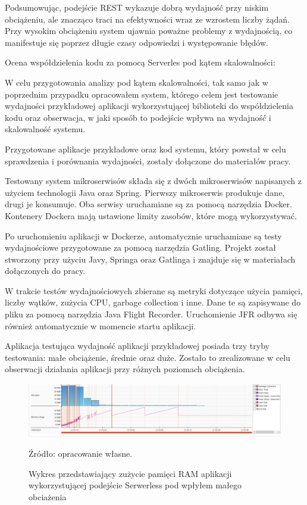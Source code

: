 \documentclass[runningheads,12pt]{llncs}
\begin{document}
Podsumowując, podejście REST wykazuje dobrą wydajność przy niskim obciążeniu, ale znacząco traci na efektywności wraz ze wzrostem liczby żądań. Przy wysokim obciążeniu system ujawnia poważne problemy z wydajnością, co manifestuje się poprzez długie czasy odpowiedzi i występowanie błędów.

\newpage



Ocena współdzielenia kodu za pomocą Serverles pod kątem skalowalności:

W celu przygotowania analizy pod kątem skalowalności, tak samo jak w poprzednim przypadku opracowałem system, którego celem jest testowanie wydajności przykładowej aplikacji wykorzystującej biblioteki do współdzielenia kodu oraz obserwacja, w jaki sposób to podejście wpływa na wydajność i skalowalność systemu.

Przygotowane aplikacje przykładowe oraz kod systemu, który powstał w celu sprawdzenia i porównania wydajności, zostały dołączone do materiałów pracy.

Testowany system mikroserwisów składa się z dwóch mikroserwisów napisanych z użyciem technologii Java oraz Spring. Pierwszy mikroserwis produkuje dane, drugi je konsumuje. Oba serwisy uruchamiane są za pomocą narzędzia Docker. Kontenery Dockera mają ustawione limity zasobów, które mogą wykorzystywać.

Po uruchomieniu aplikacji w Dockerze, automatycznie uruchamiane są testy wydajnościowe przygotowane za pomocą narzędzia Gatling. Projekt został stworzony przy użyciu Javy, Springa oraz Gatlinga i znajduje się w materiałach dołączonych do pracy.

W trakcie testów wydajnościowych zbierane są metryki dotyczące użycia pamięci, liczby wątków, zużycia CPU, garbage collection i inne. Dane te są zapisywane do pliku za pomocą narzędzia Java Flight Recorder. Uruchomienie JFR odbywa się również automatycznie w momencie startu aplikacji.

Aplikacja testująca wydajność aplikacji przykładowej posiada trzy tryby testowania: małe obciążenie, średnie oraz duże. Zostało to zrealizowane w celu obserwacji działania aplikacji przy różnych poziomach obciążenia.

\newpage

\begin{figure}
    \includegraphics[width=\linewidth]{images/serverless-memory-low-graph.jpg}
    \caption{Wykres przedstawiający zużycie pamięci  RAM aplikacji wykorzystującej podejście Serwerless pod wpłyłem małego obciażenia} \label{fig1}
    \vspace{0.5em}
    {\small Źródło: opracowanie własne.}
\end{figure}
\end{document}
